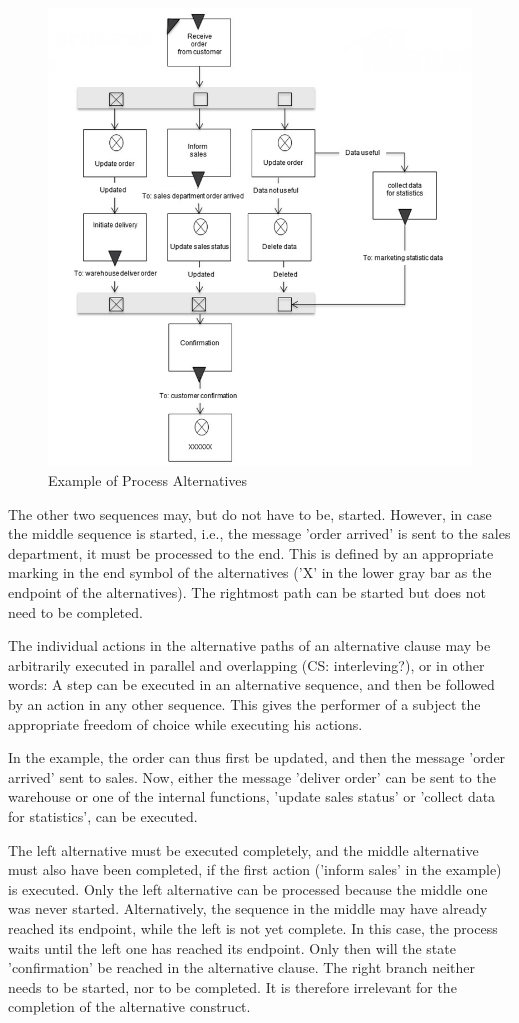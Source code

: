 \begin{figure}[htbp]
	\centering
	\includegraphics[width=0.7\linewidth]{Figures/Ontology/SubjectExecution/ALternative}
	\caption[Example of Process Alternatives]{Example of Process Alternatives}
	\label{fig:alternative}
\end{figure}

The other two sequences may, but do not have to be, started. However, in case the middle sequence is started, i.e., the message 'order arrived' is sent to the sales department, it must be processed to the end. This is defined by an appropriate marking in the end symbol of the alternatives ('X' in the lower gray bar as the endpoint of the alternatives). The rightmost path can be started but does not need to be completed.

The individual actions in the alternative paths of an alternative clause may be arbitrarily executed in parallel and overlapping (CS: interleving?), or in other words: A step can be executed in an alternative sequence, and then be followed by an action in any other sequence. This gives the performer of a subject the appropriate freedom of choice while executing his actions.

In the example, the order can thus first be updated, and then the message 'order arrived' sent to sales. Now, either the message 'deliver order' can be sent to the warehouse or one of the internal functions, 'update sales status' or 'collect data for statistics', can be executed.

The left alternative must be executed completely, and the middle alternative must also have been completed, if the first action ('inform sales' in the example) is executed. Only the left alternative can be processed because the middle one was never started. Alternatively, the sequence in the middle may have already reached its endpoint, while the left is not yet complete. In this case, the process waits until the left one has reached its endpoint. Only then will the state 'confirmation' be reached in the alternative clause. The right branch neither needs to be started, nor to be completed. It is therefore irrelevant for the completion of the alternative construct.

